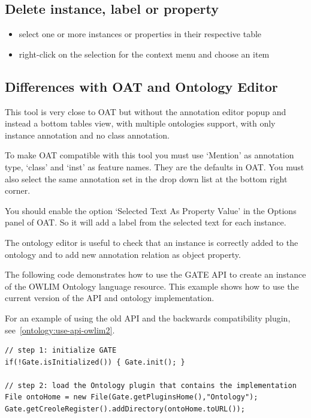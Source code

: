 {\subsection{Delete instance, label or property}

\begin{itemize}
\item select one or more instances or properties in their respective table
\item right-click on the selection for the context menu and choose an item
\end{itemize}

\subsection{Differences with OAT and Ontology Editor}

This tool is very close to OAT but without the annotation editor popup and
instead a bottom tables view, with multiple ontologies support, with only
instance annotation and no class annotation.

To make OAT compatible with this tool you must use `Mention' as annotation
type, `class' and `inst' as feature names. They are the defaults in OAT. You
must also select the same annotation set in the drop down list at the bottom
right corner.

You should enable the option `Selected Text As Property Value' in the
Options panel of OAT. So it will add a label from the selected text for each
instance.

The ontology editor is useful to check that an instance is correctly added
to the ontology and to add new annotation relation as object property.


The following code demonstrates how to use the GATE API to create an instance of
the OWLIM Ontology language resource. This example shows how to use the current
version of the API and ontology implementation. 

For an example of using the
old API and the backwards compatibility plugin, see~\ref{ontology:use-api-owlim2}.

\begin{lstlisting}
// step 1: initialize GATE
if(!Gate.isInitialized()) { Gate.init(); }

// step 2: load the Ontology plugin that contains the implementation
File ontoHome = new File(Gate.getPluginsHome(),"Ontology");
Gate.getCreoleRegister().addDirectory(ontoHome.toURL());


\end{lstlisting}}
